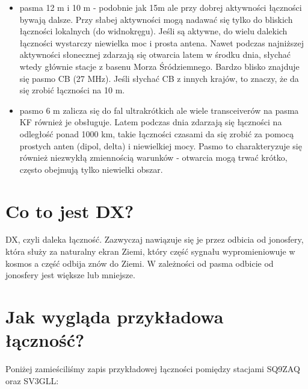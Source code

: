 \documentclass[a4paper,12pt]{article}
\begin{document}
\begin{itemize}
 \item pasma 12 m i 10 m - podobnie jak 15m ale przy dobrej aktywności łączności bywają dalsze. Przy słabej aktywności mogą nadawać się tylko do bliskich łączności lokalnych (do widnokręgu). Jeśli są aktywne, do wielu dalekich łączności wystarczy niewielka moc i prosta antena. Nawet podczas najniższej aktywności słonecznej zdarzają się otwarcia latem w środku dnia, słychać wtedy głównie stacje z basenu Morza Śródziemnego. Bardzo blisko znajduje się pasmo CB (27 MHz). Jeśli słychać CB z innych krajów, to znaczy, że da się zrobić łączności na 10 m.
 \item pasmo 6 m zalicza się do fal ultrakrótkich ale wiele transceiverów na pasma KF również je obsługuje. Latem podczas dnia zdarzają się łączności na odległość ponad 1000 km, takie łączności czasami da się zrobić za pomocą prostych anten (dipol, delta) i niewielkiej mocy. Pasmo to charakteryzuje się również niezwykłą zmiennością warunków - otwarcia mogą trwać krótko, często obejmują tylko niewielki obszar.
\end{itemize}


\section{Co to jest DX?}
DX, czyli daleka łączność. Zazwyczaj nawiązuje się je przez odbicia od jonosfery, która służy za naturalny ekran Ziemi, który część sygnału wypromieniowuje w kosmos a część odbija znów do Ziemi. W zależności od pasma odbicie od jonosfery jest większe lub mniejsze.

\section{Jak wygląda przykładowa łączność?}
Poniżej zamieściliśmy zapis przykładowej łączności pomiędzy stacjami SQ9ZAQ oraz SV3GLL:
\end{document}
